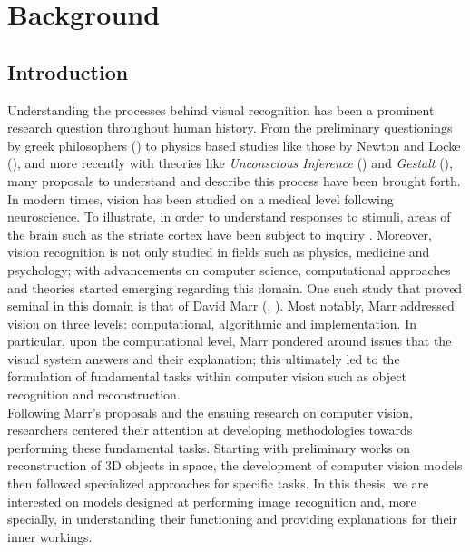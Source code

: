 \chapter{Background}
\label{ch:rel}
\chaptertoc{}
\section{Introduction}
\noindent Understanding the processes behind visual recognition has been a prominent research 
question throughout human history. From the preliminary questionings by greek philosophers 
(\cite{finger2001origins}) to physics based studies like those by Newton and Locke 
(\cite{swenson2010optics}), and more recently with theories like \textit{Unconscious Inference} 
(\cite{gullstrand1909hemholtz}) and \textit{Gestalt} (\cite{wagemans2012century}), many proposals 
to understand and describe this process have been brought forth. In modern times, vision has been 
studied on a medical level following neuroscience. To illustrate, in order to understand responses 
to stimuli, areas of the brain such as the striate cortex have been subject to inquiry 
\autocite{hubel1959receptive}. Moreover, vision recognition is not 
only studied in fields such as physics, medicine and psychology; 
with advancements on computer science, computational approaches and theories started emerging 
regarding this domain. One such study that proved seminal in this domain is that of 
David Marr (\cite{poggio1981marr}, \cite{marr2010vision}). Most notably, Marr addressed vision on 
three levels: computational, algorithmic and implementation. In particular, upon the computational 
level, Marr pondered around issues that the visual system answers and their explanation; this 
ultimately led to the formulation of fundamental tasks within computer vision such as object 
recognition and reconstruction.\\

\noindent Following Marr's proposals and the ensuing research on computer vision, researchers 
centered their attention at developing methodologies towards performing these fundamental tasks.
Starting with preliminary works on reconstruction of 3D objects in space, the development of 
computer vision models then followed specialized approaches for specific tasks. In this thesis, 
we are interested on models designed at performing image recognition and, more specially, in 
understanding their functioning and providing explanations for their inner workings.\\


